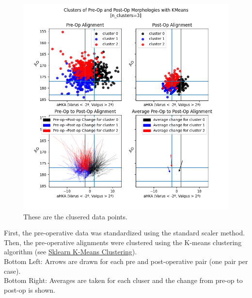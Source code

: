 \documentclass{article}
\begin{document}
\begin{figure}[t]
\includegraphics[width=\textwidth]{clusters.png}
\caption{These are the clusered data points.}
\end{figure}

First, the pre-operative data was standardized using the standard scaler method.
Then, the pre-operative alignments were clustered using the K-means clustering algorithm
(see \href{https://scikit-learn.org/stable/modules/generated/sklearn.cluster.KMeans.html#sklearn.cluster.KMeans}
{\underline{Sklearn K-Means Clustering}}).\\
Bottom Left: Arrows are drawn for each pre and post-operative pair (one pair per case).\\
Bottom Right: Averages are taken for each cluser and the change from pre-op to post-op is shown.

\newpage
\end{document}

